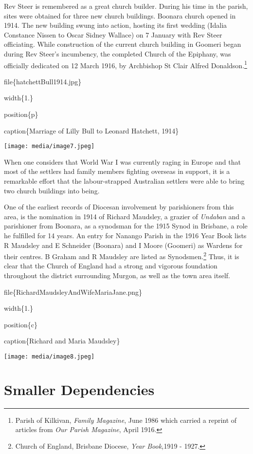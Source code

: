Rev Steer is remembered as a great church builder. During his time in the parish, sites were obtained for three new church buildings. Boonara church opened in 1914. The new building swung into action, hosting its first wedding (Idalia Constance Nissen to Oscar Sidney Wallace) on 7 January with Rev Steer officiating. While construction of the current church building in Goomeri began during Rev Steer's incumbency, the completed Church of the Epiphany, was officially dedicated on 12 March 1916, by Archbishop St Clair Alfred Donaldson.\footnote{Parish of Kilkivan, \emph{Family Magazine}, June 1986 which carried a reprint of articles from \emph{Our Parish Magazine}, April 1916.}

file\{hatchettBull1914.jpg\}

width\{1.\}

position\{p\}

caption\{Marriage of Lilly Bull to Leonard Hatchett, 1914\}

\texttt{[image: media/image7.jpeg]}

When one considers that World War I was currently raging in Europe and that most of the settlers had family members fighting overseas in support, it is a remarkable effort that the labour-strapped Australian settlers were able to bring two church buildings into being.

One of the earliest records of Diocesan involvement by parishioners from this area, is the nomination in 1914 of Richard Maudsley, a grazier of \emph{Undaban} and a parishioner from Boonara, as a synodsman for the 1915 Synod in Brisbane, a role he fulfilled for 14 years. An entry for Nanango Parish in the 1916 Year Book lists R Maudsley and E Schneider (Boonara) and I Moore (Goomeri) as Wardens for their centres. B Graham and R Maudsley are listed as Synodsmen.\footnote{Church of England, Brisbane Diocese, \emph{Year Book,}1919 - 1927.} Thus, it is clear that the Church of England had a strong and vigorous foundation throughout the district surrounding Murgon, as well as the town area itself.

file\{RichardMaudsleyAndWifeMariaJane.png\}

width\{1.\}

position\{c\}

caption\{Richard and Maria Maudsley\}

\texttt{[image: media/image8.jpeg]}

\hypertarget{smaller-dependencies}{%
\section{Smaller Dependencies}\label{smaller-dependencies}}

